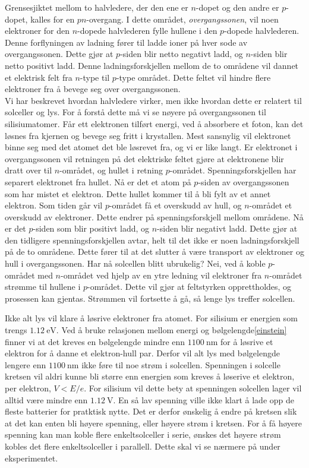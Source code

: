 \documentclass[%
 reprint,
 amsmath,amssymb,
 aps,
 norsk,
 booktabs
]{revtex4-1}
\begin{document}
Grensesjiktet mellom to halvledere, der den ene er $n$-dopet og den andre er $p$-dopet, kalles for en $pn$-overgang. I dette området, \textit{overgangssonen}, vil noen elektroner for den $n$-dopede halvlederen fylle hullene i den $p$-dopede halvlederen. Denne forflyningen av ladning fører til ladde ioner på hver sode av overgangssonen. Dette gjør at $p$-siden blir netto negativt ladd, og $n$-siden blir netto positivt ladd. Denne ladningsforskjellen mellom de to områdene vil dannet et elektrisk felt fra $n$-type til $p$-type området. Dette feltet vil hindre flere elektroner fra å bevege seg over overgangssonen.\\
Vi har beskrevet hvordan halvledere virker, men ikke hvordan dette er relatert til solceller og lys. For å  forstå dette må vi se nøyere på overgangssonen til silisiumatomer.
Får ett elektronen tilført energi, ved å absorbere et foton, kan det løsnes fra kjernen og bevege seg fritt i krystallen. Mest sansnylig vil elektronet binne seg med det atomet det ble løsrevet fra, og vi er like langt. Er elektronet i overgangssonen vil retningen på det elektriske feltet gjøre at elektronene blir dratt over til $n$-området, og hullet i retning $p$-området. Spenningsforskjellen har separert elektronet fra hullet. Nå er det et atom på $p$-siden av overgangssonen som har mistet et elektron. Dette hullet kommer til å bli fylt av et annet elektron. Som tiden går vil $p$-området få et overskudd av hull, og $n$-området et overskudd av elektroner. Dette endrer på spenningsforskjell mellom områdene. Nå er det $p$-siden som blir positivt ladd, og $n$-siden blir negativt ladd. Dette gjør at den tidligere spenningsforskjellen avtar, helt til det ikke er noen ladningsforskjell på de to områdene. Dette fører til at det slutter å være transport av elektroner og hull i overgangssonen. Har nå solcellen blitt ubrukelig? Nei, ved å koble $p$-området med $n$-området ved hjelp av en ytre ledning vil elektroner fra $n$-området strømme til hullene i $p$-området. Dette vil gjør at feltstyrken opprettholdes, og prosessen kan gjentas. Strømmen vil fortsette å gå, så lenge lys treffer solcellen.\par
Ikke alt lys vil klare å løsrive elektroner fra atomet. For silisium er energien som trengs $\SI{1.12}{\electronvolt}$. Ved å bruke relasjonen mellom energi og bølgelengde\eqref{einstein} finner vi at det kreves en bølgelengde mindre enn $\SI{1100}{\nano\meter}$ for å løsrive et elektron for å danne et elektron-hull par. Derfor vil alt lys med bølgelengde lengere enn $\SI{1100}{\nano\meter}$ ikke føre til noe strøm i solcellen. Spenningen i solcelle kretsen vil aldri kunne bli større enn energien som kreves å løserive et elektron, per elektron, $V<E/e$. For silisium vil dette bety at spenningen solcellen lager vil alltid være mindre enn $\SI{1.12}{\volt}$. En så lav spenning ville ikke klart å lade opp de fleste batterier for pratktisk nytte. Det er derfor ønskelig å endre på kretsen slik at det kan enten bli høyere spenning, eller høyere strøm i kretsen. For å få høyere spenning kan man koble flere enkeltsolceller i serie, ønskes det høyere strøm kobles det flere enkeltsolceller i parallell. Dette skal vi se nærmere på under eksperimentet.
\end{document}

